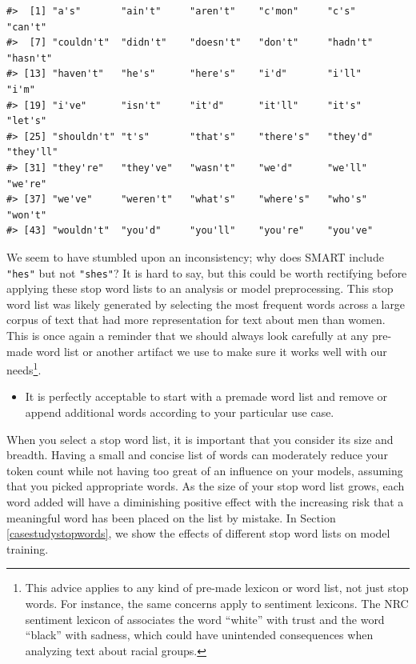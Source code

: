 \documentclass[
]{krantz}
\newenvironment{rmdblock}[1]
  {\begin{shaded*}
  \begin{itemize}[left = -1cm, labelsep = 1cm]
  \renewcommand{\labelitemi}{
    \raisebox{-.7\height}[0pt][0pt]{
      {\setkeys{Gin}{width=3em,keepaspectratio}\texttt{[image: images/\#1]}}
    }
  }
 
  \item
  }
  {
  \end{itemize}
  \end{shaded*}
  }
\newenvironment{rmdwarning}
  {\begin{rmdblock}{warning}}
  {\end{rmdblock}}
\begin{document}
\begin{verbatim}
#>  [1] "a's"       "ain't"     "aren't"    "c'mon"     "c's"       "can't"    
#>  [7] "couldn't"  "didn't"    "doesn't"   "don't"     "hadn't"    "hasn't"   
#> [13] "haven't"   "he's"      "here's"    "i'd"       "i'll"      "i'm"      
#> [19] "i've"      "isn't"     "it'd"      "it'll"     "it's"      "let's"    
#> [25] "shouldn't" "t's"       "that's"    "there's"   "they'd"    "they'll"  
#> [31] "they're"   "they've"   "wasn't"    "we'd"      "we'll"     "we're"    
#> [37] "we've"     "weren't"   "what's"    "where's"   "who's"     "won't"    
#> [43] "wouldn't"  "you'd"     "you'll"    "you're"    "you've"
\end{verbatim}

We seem to have stumbled upon an inconsistency; why does SMART include \texttt{"he\textquotesingle{}s"} but not \texttt{"she\textquotesingle{}s"}? It is hard to say, but this could be worth rectifying before applying these stop word lists to an analysis or model preprocessing. This stop word list was likely generated by selecting the most frequent words across a large corpus of text that had more representation for text about men than women. This is once again a reminder that we should always look carefully at any pre-made word list or another artifact we use to make sure it works well with our needs\footnote{This advice applies to any kind of pre-made lexicon or word list, not just stop words. For instance, the same concerns apply to sentiment lexicons. The NRC sentiment lexicon of \citet{Mohammad13} associates the word ``white'' with trust and the word ``black'' with sadness, which could have unintended consequences when analyzing text about racial groups.}.

\begin{rmdwarning}
It is perfectly acceptable to start with a premade word list and remove
or append additional words according to your particular use case.
\end{rmdwarning}

When you select a stop word list, it is important that you consider its size and breadth. Having a small and concise list of words can moderately reduce your token count while not having too great of an influence on your models, assuming that you picked appropriate words. As the size of your stop word list grows, each word added will have a diminishing positive effect with the increasing risk that a meaningful word has been placed on the list by mistake. In Section \ref{casestudystopwords}, we show the effects of different stop word lists on model training.
\end{document}
